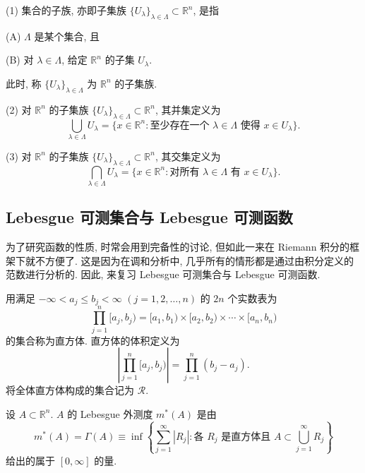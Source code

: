 \begin{definition}\label{def:2.1}
(1) 集合的子族, 亦即子集族 $\{U_{\lambda}\}_{\lambda\in\Lambda}\subset\mathbb{R}^{n}$, 是指

(A) $\Lambda$ 是某个集合, 且

(B) 对 $\lambda \in \Lambda$, 给定 $\mathbb{R}^{n}$ 的子集 $U_{\lambda}$.

此时, 称 $\{U_{\lambda}\}_{\lambda\in\Lambda}$ 为 $\mathbb{R}^{n}$ 的子集族.

(2) 对 $\mathbb{R}^{n}$ 的子集族 $\{U_{\lambda}\}_{\lambda\in\Lambda}\subset\mathbb{R}^{n}$, 其并集定义为
\[
\bigcup_{\lambda \in \Lambda}U_{\lambda} = \{x \in \mathbb{R}^{n} : \text{至少存在一个 } \lambda \in \Lambda \text{ 使得 } x \in U_{\lambda}\}.
\]

(3) 对 $\mathbb{R}^{n}$ 的子集族 $\{U_{\lambda}\}_{\lambda\in\Lambda}\subset\mathbb{R}^{n}$, 其交集定义为
\[
\bigcap_{\lambda \in \Lambda}U_{\lambda} = \{x \in \mathbb{R}^{n} : \text{对所有 } \lambda \in \Lambda \text{ 有 } x \in U_{\lambda}\}.
\]
\end{definition}

\subsection*{Lebesgue 可测集合与 Lebesgue 可测函数}

为了研究函数的性质, 时常会用到完备性的讨论, 但如此一来在 Riemann 积分的框架下就不方便了. 这是因为在调和分析中, 几乎所有的情形都是通过由积分定义的范数进行分析的. 因此, 来复习 Lebesgue 可测集合与 Lebesgue 可测函数.

\begin{definition}[直方体]\label{def:2.2}
用满足 $-\infty < a_{j} \leq b_{j} < \infty$ $(j = 1, 2, \ldots, n)$ 的 $2n$ 个实数表为
\[
\prod_{j=1}^{n}[a_{j}, b_{j}) = [a_{1}, b_{1}) \times [a_{2}, b_{2}) \times \cdots \times [a_{n}, b_{n})
\]
的集合称为直方体. 直方体的体积定义为
\[
\left|\prod_{j=1}^{n}[a_{j}, b_{j})\right| = \prod_{j=1}^{n}(b_{j} - a_{j}).
\]
将全体直方体构成的集合记为 $\mathcal{R}$.
\end{definition}

\begin{definition}\label{def:2.3}
设 $A \subset \mathbb{R}^{n}$. $A$ 的 Lebesgue 外测度 $m^{*}(A)$ 是由
\[
m^{*}(A) = \Gamma(A) \equiv \inf\left\{\sum_{j=1}^{\infty}|R_{j}| : \text{各 } R_{j} \text{ 是直方体且 } A \subset \bigcup_{j=1}^{\infty}R_{j}\right\}
\]
给出的属于 $[0, \infty]$ 的量.
\end{definition}

